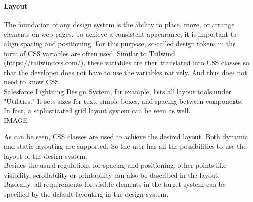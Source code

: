 

\paragraph{Layout}
The foundation of any design system is the ability to place, move, or arrange elements on web pages. To achieve a consistent appearance, it is important to align spacing and positioning. 
For this purpose, so-called design tokens in the form of CSS variables are often used. Similar to Tailwind (\url{https://tailwindcss.com/}), these variables are then translated into CSS classes so that the developer does not have to use the variables natively. And thus does not need to know CSS.  \\
Salesforce Lightning Design System, for example, lists all layout tools under "Utilities." It sets sizes for text, simple boxes, and spacing between components. In fact, a sophisticated grid layout system can be seen as well. \\

IMAGE

As can be seen, CSS classes are used to achieve the desired layout. Both dynamic and static layouting are supported. So the user has all the possibilities to use the layout of the design system. \\
Besides the usual regulations for spacing and positioning, other points like visibility, scrollability or printability can also be described in the layout. Basically, all requirements for visible elements in the target system can be specified by the default layouting in the design system.

